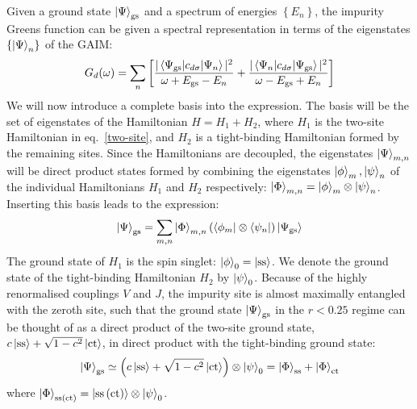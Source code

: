 \documentclass[reprint,superscriptaddress,floatfix]{revtex4-2}
\begin{document}
Given a ground state \(\ket{\Psi}_\text{gs}\) and a spectrum of energies \(\left\{ E_n \right\} \), the impurity Greens function can be given a spectral representation in terms of the eigenstates \(\left\{\ket{\Psi}_n\right\}\) of the GAIM:
\begin{equation}\begin{aligned}
G_d(\omega) = \sum_n \left[ \frac{|\braket{\Psi_\text{gs} | c_{d\sigma} | \Psi_n}|^2}{\omega + E_\text{gs} - E_n} + \frac{|\braket{\Psi_n | c_{d\sigma} | \Psi_\text{gs}}|^2}{\omega - E_\text{gs} + E_n}\right] 
\end{aligned}\end{equation}
We will now introduce a complete basis into the expression. The basis will be the set of eigenstates of the Hamiltonian  \(H = H_1 + H_2\), where \(H_1\) is the two-site Hamiltonian in eq.~\ref{two-site}, and \(H_2\) is a tight-binding Hamiltonian formed by the remaining sites. Since the Hamiltonians are decoupled, the eigenstates \(\ket{\Psi}_{m,n}\) will be direct product states formed by combining the eigenstates \(\ket{\phi}_m,\ket{\psi}_n\) of the individual Hamiltonians \(H_1\) and \(H_2\) respectively: \(\ket{\Phi}_{m,n} = \ket{\phi}_m\otimes\ket{\psi}_n\). Inserting this basis leads to the expression:
\begin{equation}\begin{aligned}
	\label{summation}
	\ket{\Psi}_\text{gs} = \sum_{m,n} \ket{\Phi}_{m,n} \left(\bra{\phi_{m}}\otimes\bra{\psi_n}\right)\ket{\Psi_\text{gs}}
\end{aligned}\end{equation}
The ground state of \(H_1\) is the spin singlet: \(\ket{\phi}_0 = \ket{\text{ss}}\). We denote the ground state of the tight-binding Hamiltonian \(H_2\) by \(\ket{\psi}_0\). Because of the highly renormalised couplings \(V\) and \(J\), the impurity site is almost maximally entangled with the zeroth site, such that the ground state \(\ket{\Psi}_\text{gs}\) in the \(r < 0.25\) regime can be thought of as a direct product of the two-site ground state, \(c\ket{\text{ss}} + \sqrt{1-c^2}\ket{\text{ct}}\), in direct product with the tight-binding ground state:
\begin{equation}\begin{aligned}
	\ket{\Psi}_\text{gs} \simeq \left(c\ket{\text{ss}} + \sqrt{1-c^2}\ket{\text{ct}}\right)  \otimes \ket{\psi}_0 = \ket{\Phi}_\text{ss} + \ket{\Phi}_\text{ct}
\end{aligned}\end{equation}
where \(\ket{\Phi}_\text{ss(ct)} = \ket{\text{ss}\left( \text{ct} \right)}\otimes\ket{\psi}_0 \).
\end{document}
